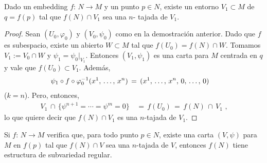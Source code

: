 \begin{propoEmbeddingEntornoTajada}\label{propo:embeddingentornotajada}
	Dado un embedding $f:\,N\rightarrow M$ y un punto $p\in N$, existe un
	entorno $V_1\subset M$ de $q=f(p)$ tal que $f(N)\cap V_1$ sea una $n$-%
	tajada de $V_1$.
\end{propoEmbeddingEntornoTajada}

\begin{proof}
	Sean $(U_0,\varphi_0)$ y $(V_0,\psi_0)$ como en la demostraci\'{o}n
	anterior. Dado que $f$ es subespacio, existe un abierto $W\subset M$
	tal que $f(U_0)=f(N)\cap W$. Tomamos $V_1:=V_0\cap W$ y
	$\psi_1=\psi_0|_{V_1}$. Entonces $(V_1,\psi_1)$ es una carta para $M$
	centrada en $q$ y vale que $f(U_0)\subset V_1$. Adem\'{a}s,
	\begin{align*}
		\psi_1\circ f\circ\varphi_0^{-1}(\lista*{x}{n}) & \,=\,
			(\lista*{x}{n},\,0,\,\dots,\,0)
	\end{align*}
	($k=n$). Pero, entonces,
	\begin{align*}
		V_1\,\cap\,\big\{\psi^{n+1}=\cdots=\psi^m=0\big\} & \,=\,
			f(U_0) \,=\,f(N)\,\cap\,V_1
		\text{ ,}
	\end{align*}
	lo que quiere decir que $f(N)\cap V_1$ es una $n$-tajada de $V_1$.
\end{proof}

\begin{propoEntornoTajadaEmbedding}\label{propo:entornotajadaembedding}
	Si $f:\,N\rightarrow M$ verifica que, para todo punto $p\in N$, existe
	una carta $(V,\psi)$ para $M$ en $f(p)$ tal que $f(N)\cap V$ sea una
	$n$-tajada de $V$, entonces $f(N)$ tiene estructura de subvariedad
	regular.
\end{propoEntornoTajadaEmbedding}

